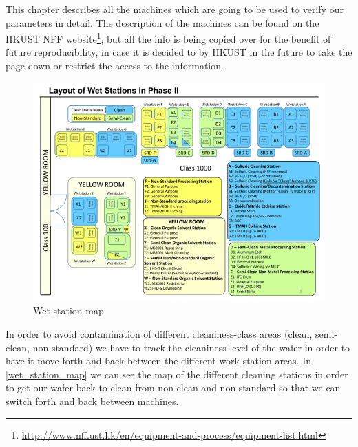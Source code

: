 This chapter describes all the machines which are going to be used to verify our parameters in detail.
The description of the machines can be found on the HKUST NFF website\footnote{\url{http://www.nff.ust.hk/en/equipment-and-process/equipment-list.html}}, but all the info is being copied over for the benefit of future reproducibility, in case it is decided to by HKUST in the future to take the page down or restrict the access to the information.

\begin{figure}[H]
	\centering
	\includegraphics[scale=2]{pictures_machines/wetstations_phase2.png}
	\caption{Wet station map}
	\label{wet_station_map}
\end{figure}

In order to avoid contamination of different cleaniness-class areas (clean, semi-clean, non-standard) we have to track the cleaniness level of the wafer in order to have it move forth and back between the different work station areas.
In \autoref{wet_station_map} we can see the map of the different cleaning stations in order to get our wafer back to clean from non-clean and non-standard so that we can switch forth and back between machines.
